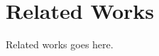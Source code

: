 \section{Related Works}

Related works goes here.

\cite{marszalek2007semantic}
\cite{li2010building}
\cite{deselaers2011visual}
\cite{zhao2011large}
